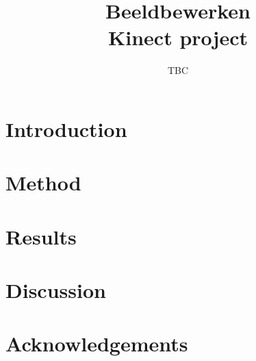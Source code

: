\documentclass{article}
\title{
  Beeldbewerken \\ Kinect project
}
\author{
    TBC
}
\begin{document}
\maketitle

\renewcommand{\abstractname}{Executive Summary}

\newpage
\begin{abstract}

    

\end{abstract}

\clearpage

\tableofcontents

\clearpage

\section{Introduction} %
\label{sec:introduction}

    



\section{Method} %
\label{sec:method}

    



\section{Results} %
\label{sec:results}

    



\section{Discussion} %
\label{sec:discussion}

    



\section{Acknowledgements} %
\label{sec:discussion}

    



\appendix

\section{} %
\label{sec:appendixA}

    

\end{document}
